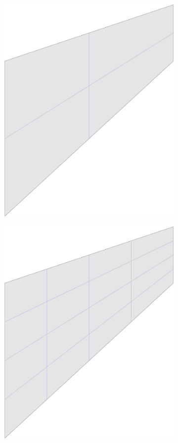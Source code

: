 \documentclass{article}
\begin{document}
\begin{figure}[htb!]
\begin{subfigure}[b]{0.18\linewidth}
        \includegraphics[width=\linewidth]{mesh_cook_1}
    \end{subfigure}
    \begin{subfigure}[b]{0.18\linewidth}        %
        \centering
        \includegraphics[width=\linewidth]{mesh_cook_2}

\end{subfigure}
\end{figure}
\end{document}
